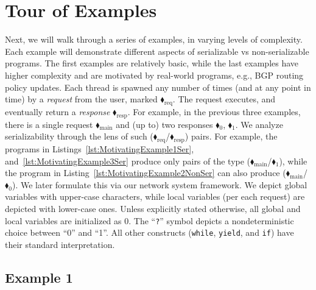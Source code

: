 \appendix


\section{Tour of Examples}
\label{appendix:tour}


Next, we will walk through a series of examples, in varying levels of complexity. Each example will demonstrate different aspects of serializable vs non-serializable programs.
%
The first examples are relatively basic, while the last examples have higher complexity and are motivated by real-world programs, e.g., BGP routing policy updates.
%
Each thread is spawned any number of times (and at any point in time) by a \textit{request} from the user, marked {\color{ForestGreen}$\blacklozenge_\text{req}$}. The request executes, and eventually return a \textit{response}  {\color{red}$\blacklozenge_\text{resp}$}.
%
For example, in the previous three examples, there is a single request {\color{ForestGreen}$\blacklozenge_\text{main}$} and (up to) two responses {\color{red}$\blacklozenge_0$}, {\color{red}$\blacklozenge_1$}.
% 
We analyze serializability through the lens of such ({\color{ForestGreen}$\blacklozenge_\text{req}$}/{\color{red}$\blacklozenge_\text{resp}$}) pairs. For example, the programs in Listings~\ref{lst:MotivatingExample1Ser}, and~\ref{lst:MotivatingExample3Ser} produce only pairs of the type ({\color{ForestGreen}$\blacklozenge_\text{main}$}/{\color{red}$\blacklozenge_1$}), while the program in Listing~\ref{lst:MotivatingExample2NonSer} can also produce ({\color{ForestGreen}$\blacklozenge_\text{main}$}/{\color{red}$\blacklozenge_0$}). We later formulate this via our network system framework. 
%
We depict global variables with upper-case characters, while local variables (per each request) are depicted with lower-case ones.
%
Unless explicitly stated otherwise, all global and local variables are initialized as 0.
%
The ``\texttt{?}'' symbol depicts a nondeterministic choice between ``0'' and ``1''. All other constructs (\texttt{while}, \texttt{yield}, and \texttt{if}) have their standard interpretation.

\subsection{Example 1}


